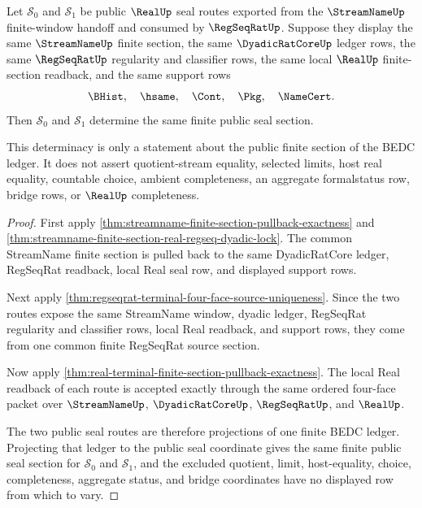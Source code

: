 \begin{theorem}
\label{thm:streamname-regseqrat-real-public-seal-finite-section-determinacy}
Let $\mathcal S_0$ and $\mathcal S_1$ be public $\RealUp$ seal routes exported
from the $\StreamNameUp$ finite-window handoff and consumed by
$\RegSeqRatUp$. Suppose they display the same $\StreamNameUp$ finite section,
the same $\DyadicRatCoreUp$ ledger rows, the same $\RegSeqRatUp$ regularity
and classifier rows, the same local $\RealUp$ finite-section readback, and the
same support rows
$$
\BHist,\quad \hsame,\quad \Cont,\quad \Pkg,\quad \NameCert.
$$
Then $\mathcal S_0$ and $\mathcal S_1$ determine the same finite public seal
section.

This determinacy is only a statement about the public finite section of the
BEDC ledger. It does not assert quotient-stream equality, selected limits,
host real equality, countable choice, ambient completeness, an aggregate
formalstatus row, bridge rows, or $\RealUp$ completeness.
\end{theorem}
\begin{proof}
First apply \autoref{thm:streamname-finite-section-pullback-exactness} and
\autoref{thm:streamname-finite-section-real-regseq-dyadic-lock}. The common
StreamName finite section is pulled back to the same DyadicRatCore ledger,
RegSeqRat readback, local Real seal row, and displayed support rows.

Next apply \autoref{thm:regseqrat-terminal-four-face-source-uniqueness}. Since
the two routes expose the same StreamName window, dyadic ledger, RegSeqRat
regularity and classifier rows, local Real readback, and support rows, they
come from one common finite RegSeqRat source section.

Now apply \autoref{thm:real-terminal-finite-section-pullback-exactness}. The
local Real readback of each route is accepted exactly through the same ordered
four-face packet over $\StreamNameUp$, $\DyadicRatCoreUp$, $\RegSeqRatUp$, and
$\RealUp$.

The two public seal routes are therefore projections of one finite BEDC
ledger. Projecting that ledger to the public seal coordinate gives the same
finite public seal section for $\mathcal S_0$ and $\mathcal S_1$, and the
excluded quotient, limit, host-equality, choice, completeness, aggregate
status, and bridge coordinates have no displayed row from which to vary.
\end{proof}

